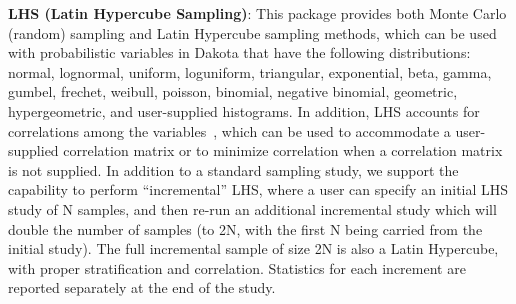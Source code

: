 


\textbf{LHS (Latin Hypercube Sampling)}: This package provides both
Monte Carlo (random) sampling and Latin Hypercube sampling methods,
which can be used with probabilistic variables in Dakota that have the
following distributions: normal, lognormal, uniform, loguniform,
triangular, exponential, beta, gamma, gumbel, frechet, weibull, poisson, 
binomial, negative binomial, geometric, hypergeometric, and
user-supplied histograms. In addition, LHS accounts for correlations
among the variables~\cite{Ima84}, which can be used to accommodate a
user-supplied correlation matrix or to minimize correlation when a
correlation matrix is not supplied. 
In addition to a standard sampling study, we support the capability to perform 
``incremental'' LHS, where a user can specify an initial LHS study 
of N samples, and then re-run an additional incremental study which 
will double the number of samples (to 2N, with the first N being 
carried from the initial study). The full incremental sample of 
size 2N is also a Latin Hypercube, with proper stratification and 
correlation. Statistics for each increment are reported separately at
the end of the study.

